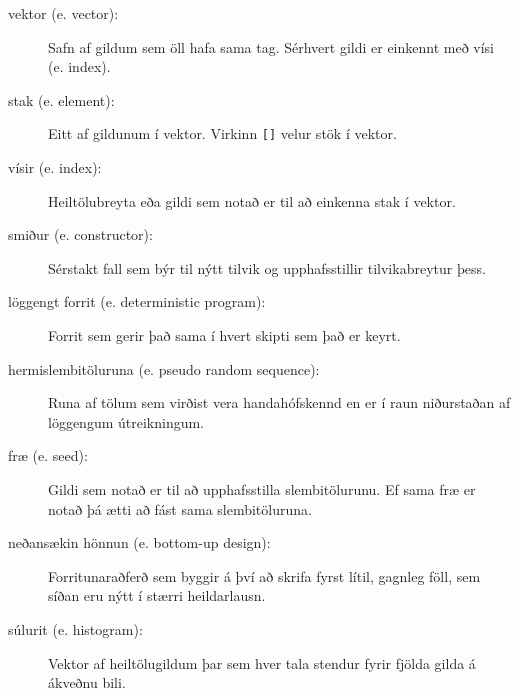 \begin{description}

\item[vektor (e. vector):]  Safn af gildum sem öll hafa sama tag. Sérhvert gildi er einkennt með vísi (e. index).

\item[stak (e. element):]  Eitt af gildunum í vektor. Virkinn {\tt []} velur stök í vektor.

\item[vísir (e. index):]  Heiltölubreyta eða gildi sem notað er til að einkenna stak í vektor. 

\item[smiður (e. constructor):]  Sérstakt fall sem býr til nýtt tilvik og upphafsstillir tilvikabreytur þess.

\item[löggengt forrit (e. deterministic program):]  Forrit sem gerir það sama í hvert skipti sem það er keyrt.

\item[hermislembitöluruna (e. pseudo random sequence):]  Runa af tölum sem virðist vera handahófskennd en er í raun niðurstaðan af löggengum útreikningum.

\item[fræ (e. seed):]  Gildi sem notað er til að upphafsstilla slembitölurunu.
Ef sama fræ er notað þá ætti að fást sama slembitöluruna.

\item[neðansækin hönnun (e. bottom-up design):]  Forritunaraðferð sem byggir á því að skrifa fyrst lítil, gagnleg föll, sem síðan eru nýtt í stærri heildarlausn.

\item[súlurit (e. histogram):]  Vektor af heiltölugildum þar sem hver tala stendur fyrir fjölda gilda á ákveðnu bili.


\end{description}
